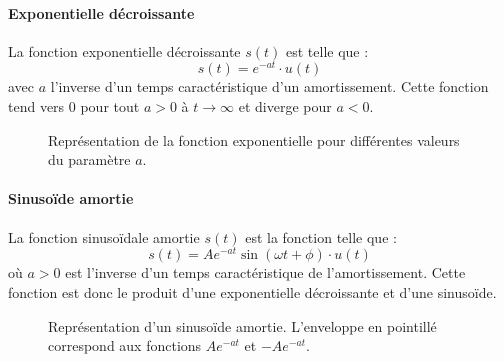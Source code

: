 \paragraph{Exponentielle décroissante}
La fonction exponentielle décroissante $s(t)$ est telle que :
$$
s(t)=e^{-at}\cdot u(t)
$$  
avec $a$ l'inverse d'un temps caractéristique d'un amortissement.
Cette fonction tend vers 0 pour tout $a>0$ à $t\rightarrow\infty$ et 
diverge pour $a<0$.
\begin{figure}[!h]
\begin{center}

\end{center}
    \caption{Représentation de la fonction exponentielle pour 
             différentes valeurs du paramètre $a$.\label{fig-exp}}
\end{figure}

\paragraph{Sinuso\"ide amortie}
La fonction sinuso\"idale amortie $s(t)$ est la fonction telle que :
$$
s(t)=Ae^{-at}\sin{(\omega t +\phi)}\cdot u(t)
$$
où $a>0$ est l'inverse d'un temps caractéristique de l'amortissement.
Cette fonction est donc le produit d'une exponentielle décroissante et 
d'une sinuso\"ide.
\begin{figure}[!h]
\begin{center}

\end{center}
    \caption{Représentation d'un sinuso\"ide amortie. L'enveloppe en pointillé 
             correspond aux fonctions $Ae^{-at}$ et $-Ae^{-at}$.
             \label{fig-sin_amor}}
\end{figure}

\clearpage
